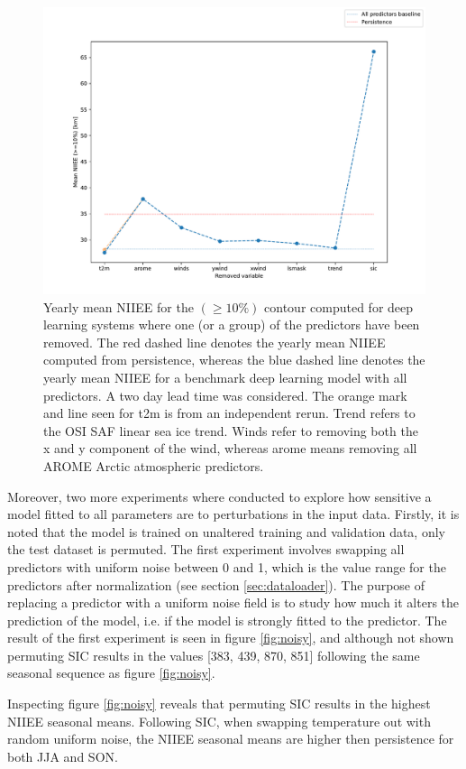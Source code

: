 \documentclass[../main/thesis.tex]{subfiles}
\begin{document}
\begin{figure}
    \centering
    \includegraphics[width=.8\textwidth]{leave_one_out.pdf}
    \caption{\label{fig:leave-one-out}Yearly mean NIIEE for the $(\geq10\%)$ contour computed for deep learning systems where one (or a group) of the predictors have been removed. The red dashed line denotes the yearly mean NIIEE computed from persistence, whereas the blue dashed line denotes the yearly mean NIIEE for a benchmark deep learning model with all predictors. A two day lead time was considered. The orange mark and line seen for t2m is from an independent rerun. Trend refers to the OSI SAF linear sea ice trend. Winds refer to removing both the x and y component of the wind, whereas arome means removing all AROME Arctic atmospheric predictors.}
\end{figure}

Moreover, two more experiments where conducted to explore how sensitive a model fitted to all parameters are to perturbations in the input data. Firstly, it is noted that the model is trained on unaltered training and validation data, only the test dataset is permuted. The first experiment involves swapping all predictors with uniform noise between 0 and 1, which is the value range for the predictors after normalization (see section \ref{sec:dataloader}). The purpose of replacing a predictor with a uniform noise field is to study how much it alters the prediction of the model, i.e. if the model is strongly fitted to the predictor. The result of the first experiment is seen in figure \ref{fig:noisy}, and although not shown permuting SIC results in the values [383, 439, 870, 851] following the same seasonal sequence as figure \ref{fig:noisy}.

Inspecting figure \ref{fig:noisy} reveals that permuting SIC results in the highest NIIEE seasonal means. Following SIC, when swapping temperature out with random uniform noise, the NIIEE seasonal means are higher then persistence for both JJA and SON. 
\end{document}
